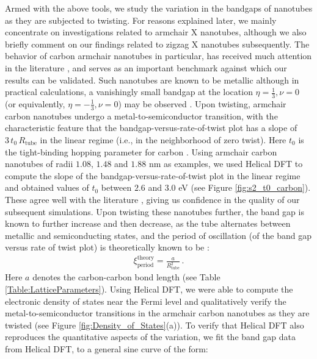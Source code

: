 \documentclass[preprint,12pt, 3p, sort&compress]{elsarticle}
\begin{document}
Armed with the above tools, we study the variation in the bandgaps of nanotubes as they are subjected to twisting. For reasons explained later, we mainly concentrate on investigations related to armchair X nanotubes, although we also briefly comment on our findings related to zigzag X nanotubes subsequently. The behavior of carbon armchair nanotubes in particular, has received much attention in the literature \citep{yang2000electronic, ding2002analytical, yang1999band, Dumitrica_Tight_Binding1}, and serves as an important benchmark against which our results can be validated. Such nanotubes are known to be metallic \citep{yang1999band, Lieber_CNT, ding2002analytical} although in practical calculations, a vanishingly small bandgap at the location $\eta = \frac{1}{3}, \nu = 0$ (or equivalently, $\eta = -\frac{1}{3}, \nu = 0$) may be observed \citep{ghosh2019symmetry}. Upon twisting, armchair carbon nanotubes undergo a metal-to-semiconductor transition, with the characteristic feature that the bandgap-versus-rate-of-twist plot has a slope of  $3\,t_{0}\,R_{\text{tube}}$ in the linear regime (i.e., in the neighborhood of zero twist). Here $t_{0}$ is the tight-binding hopping parameter for carbon \citep{Dumitrica_Tight_Binding1}. Using armchair carbon nanotubes of radii $1.08$, $1.48$ and $1.88$ nm as examples, we used Helical DFT to compute the slope of the bandgap-versus-rate-of-twist plot in the linear regime and obtained values of $t_0$ between $2.6$ and $3.0$ eV (see Figure \ref{fig:s2_t0_carbon}). These agree well with the literature \citep{Dumitrica_Tight_Binding1, correa2010tight, yang1999band}, giving us confidence in the quality of our subsequent simulations. Upon twisting these nanotubes further, the band gap is known to further increase and then decrease, as the tube alternates between metallic and semiconducting states, and the period of oscillation (of the band gap versus rate of twist plot) is  theoretically known to be \citep{yang2000electronic, ding2002analytical, yang1999band, Dumitrica_Tight_Binding1}:
\begin{align}
\xi_{\text{period}}^{\text{theory}} = \displaystyle \frac{a}{R_{\text{tube}}^2}\,.
\label{eq:period_BG}
\end{align}
Here $a$ denotes the carbon-carbon bond length (see Table \ref{Table:LatticeParameters}). Using Helical DFT, we were able to compute the electronic density of states near the Fermi level and qualitatively verify the metal-to-semiconductor transitions in the armchair carbon nanotubes as they are twisted (see Figure \ref{fig:Density_of_States}(a)). To verify that Helical DFT also reproduces the quantitative aspects of the variation, we fit the band gap data from Helical DFT, to a general sine curve of the form:
\end{document}

